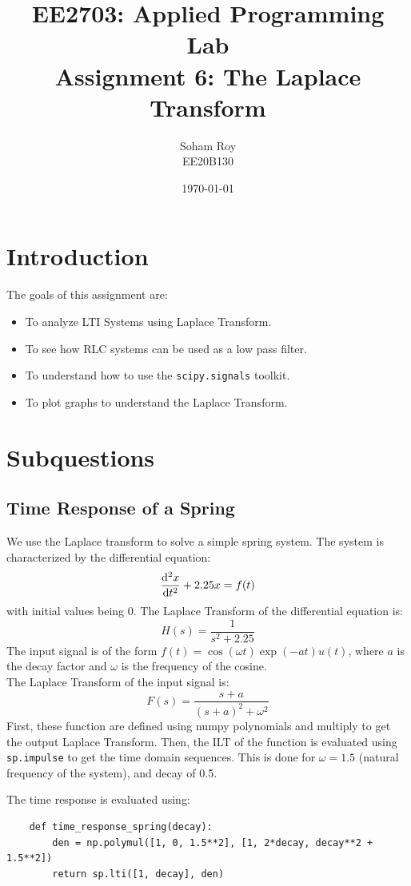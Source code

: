 \documentclass[12pt, a4paper]{article}
\title{EE2703: Applied Programming Lab \\ \Large Assignment 6: The Laplace Transform}
\author{Soham Roy \\ \normalsize EE20B130}
\date{\today}
\newcommand{\code}{\lstinline[basicstyle=\small]}
\begin{document}
\maketitle %



\section{Introduction}
The goals of this assignment are:
\begin{itemize}
    \item To analyze LTI Systems using Laplace Transform.
    \item To see how RLC systems can be used as a low pass filter.
    \item To understand how to use the \code{scipy.signals} toolkit.
    \item To plot graphs to understand the Laplace Transform.
\end{itemize}




\section{Subquestions}
\subsection{Time Response of a Spring}
We use the Laplace transform to solve a simple spring system.
The system is characterized by the differential equation:
\[\dv[2]{x}{t} + 2.25x = f(t)\]
with initial values being 0.
The Laplace Transform of the differential equation is:
\[H(s) =  \frac{1}{s^2+2.25}\]
The input signal is of the form \(f(t) = \cos{(\omega t)}\exp(-at)u(t)\),
where $a$ is the decay factor and $\omega$ is the frequency of the cosine. \\
The Laplace Transform of the input signal is:
\[ F(s) = \frac{s+a}{(s+a)^2+\omega^2 }\]
First, these function are defined using numpy polynomials and multiply to get the output Laplace Transform.
Then, the ILT of the function is evaluated using \code{sp.impulse} to get the time domain sequences.
This is done for $\omega=1.5$ (natural frequency of the system), and decay of 0.5.
\pagebreak

The time response is evaluated using:
\begin{lstlisting}
    def time_response_spring(decay):
        den = np.polymul([1, 0, 1.5**2], [1, 2*decay, decay**2 + 1.5**2])
        return sp.lti([1, decay], den)
\end{lstlisting}
\end{document}
